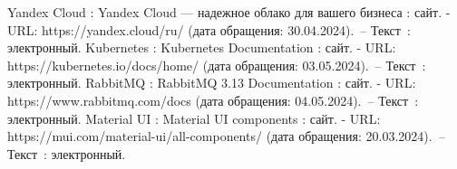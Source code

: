 \begin{thebibliography}{9}
	 Yandex Cloud : Yandex Cloud — надежное облако для вашего бизнеса : сайт. - URL: https://yandex.cloud/ru/ (дата обращения: 30.04.2024).~– Текст~: электронный.
	 Kubernetes : Kubernetes Documentation : сайт. - URL: https://kubernetes.io/docs/home/ (дата обращения: 03.05.2024).~– Текст~: электронный.
	 RabbitMQ : RabbitMQ 3.13 Documentation : сайт. - URL: https://www.rabbitmq.com/docs (дата обращения: 04.05.2024).~– Текст~: электронный.
	 Material UI : Material UI components : сайт. - URL: https://mui.com/material-ui/all-components/ (дата обращения: 20.03.2024).~– Текст~: электронный.
\end{thebibliography}
